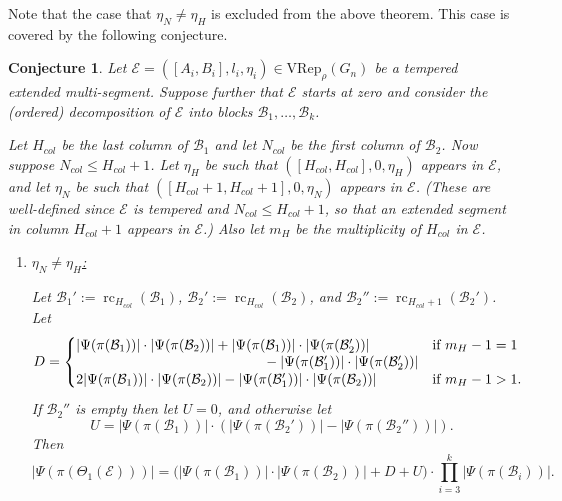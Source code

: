 \documentclass[11pt,letterpaper]{amsart}
\newcommand{\VRep}{{\mathrm{VRep}}}
\newcommand{\BB}{\mathcal{B}}
\newcommand{\EE}{\mathcal{E}}
\newcommand{\rc}{\operatorname{rc}}
\newtheorem{conj}[thm]{Conjecture}
\numberwithin{equation}{section}
\begin{document}
Note that the case that $\eta_N\neq\eta_H$ is excluded from the above theorem. This case is covered by the following conjecture.












\begin{conj}
\label{conj-count-theta-temp}
    Let $\EE = ([A_i, B_i], l_i, \eta_i)\in\VRep_\rho(G_n)$ be a tempered extended multi-segment. Suppose further that $\EE$ starts at zero and consider the (ordered) decomposition of $\EE$ into blocks $\mathcal{B}_1, \dots, \mathcal{B}_k$. 

    Let $H_{col}$ be the last column of $\mathcal{B}_1$ and let $N_{col}$ be the first column of $\mathcal{B}_2$.
    Now suppose $N_{col} \leq H_{col}+1$. Let $\eta_H$ be such that $([H_{col}, H_{col}], 0, \eta_H)$ appears in $\EE$, and let $\eta_N$ be such that $([H_{col}+1, H_{col}+1], 0, \eta_N)$ appears in $\EE$. (These are well-defined since $\EE$ is tempered and $N_{col} \leq H_{col}+1$, so that an extended segment in column $H_{col}+1$ appears in $\EE$.) Also let $m_H$ be the multiplicity of $H_{col}$ in $\EE$. 
    \begin{enumerate}
        \item [Case 7.] \underline{$\eta_N \neq \eta_H$:} %

        Let $\BB_1' := \rc_{H_{col}}(\BB_1)$, $\BB_2' := \rc_{H_{col}}(\BB_2)$, and $\BB_2'' := \rc_{H_{col}+1}(\BB_2')$. Let
        \[D = \begin{cases}
            \parbox[t]{3.4in}{%
            $|\Psi(\pi(\mathcal{B}_1))| \cdot |\Psi(\pi(\mathcal{B}_2))| + |\Psi(\pi(\mathcal{B}_1))| \cdot |\Psi(\pi(\mathcal{B}_2'))|$ \\
            \null\hfill${}- |\Psi(\pi(\mathcal{B}_1'))| \cdot |\Psi(\pi(\mathcal{B}_2'))|$} & \text{if } m_H - 1 = 1 \\
            2 |\Psi(\pi(\mathcal{B}_1))| \cdot |\Psi(\pi(\mathcal{B}_2))| - |\Psi(\pi(\mathcal{B}_1'))| \cdot |\Psi(\pi(\mathcal{B}_2))| & \text{if } m_H-1 > 1.
        \end{cases}\]
        If $\mathcal{B}_2''$ is empty then let $U=0$, and otherwise let \[U = |\Psi(\pi(\mathcal{B}_1))| \cdot (|\Psi(\pi(\mathcal{B}_2'))| - |\Psi(\pi(\mathcal{B}_2''))|).\]
        Then \[|\Psi(\pi(\Theta_1(\EE)))| = \big( |\Psi(\pi(\mathcal{B}_1))| \cdot |\Psi(\pi(\mathcal{B}_2))| + D + U \big) \cdot \prod_{i=3}^k |\Psi(\pi(\mathcal{B}_i))|.\]
    \end{enumerate}
\end{conj}
\end{document}

